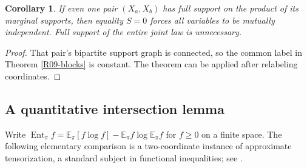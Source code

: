 \documentclass[11pt,a4paper]{article}
\newtheorem{corollary}[theorem]{Corollary}
\theoremstyle{definition}\newtheorem{definition}[theorem]{Definition}
\theoremstyle{remark}\newtheorem{remark}[theorem]{Remark}
\newcommand{\E}{\mathbb E}\newcommand{\one}{\mathbf 1}\newcommand{\1}{\mathbf 1}
\numberwithin{equation}{section}
\begin{document}
\begin{corollary}\label{R09-rectangular}
If even one pair $(X_a,X_b)$ has full support on the product of its marginal supports, then equality $S=0$ forces all variables to be mutually independent. Full support of the entire joint law is unnecessary.
\end{corollary}
\begin{proof}
That pair's bipartite support graph is connected, so the common label in Theorem \ref{R09-blocks} is constant. The theorem can be applied after relabeling coordinates.
\end{proof}

\subsection{A quantitative intersection lemma}\label{R09-sec-3}
Write $\operatorname{Ent}_\pi f=\E_\pi[f\log f]-\E_\pi f\log\E_\pi f$ for $f\ge0$ on a finite space. The following elementary comparison is a two-coordinate instance of approximate tensorization, a standard subject in functional inequalities; see \cite{ref078}.
\end{document}
